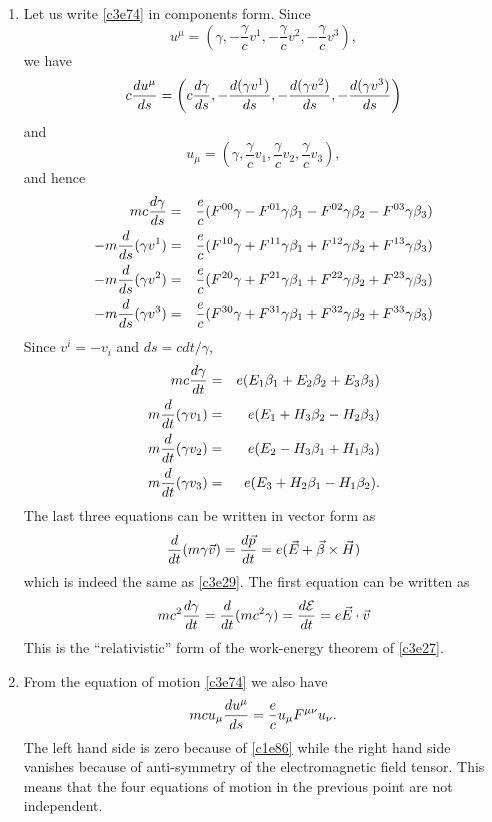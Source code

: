 \begin{enumerate}
\item Let us write \eqref{c3e74} in components form. Since
\[
u^\mu = \left(\gamma, -\frac{\gamma}{c}v^1, -\frac{\gamma}{c}v^2, -\frac{\gamma}{c}v^3\right),
\]
we have
\[
c\frac{d{u^\mu}}{d{s}} = \left(c\frac{d{\gamma}}{d{s}}, -\frac{d{(\gamma v^1)}}{d{s}}, 
-\frac{d{(\gamma v^2)}}{d{s}}, -\frac{d{(\gamma v^3)}}{d{s}}\right)
\]
and
\[
u_\mu = \left(\gamma, \frac{\gamma}{c}v_1, \frac{\gamma}{c}v_2, \frac{\gamma}{c}v_3\right),
\]
and hence
\begin{eqnarray*}
mc\frac{d{\gamma}}{d{s}} &=& \frac{e}{c}(F^{00}\gamma - F^{01}\gamma \beta_1 - F^{02}\gamma \beta_2 -F^{03}\gamma \beta_3) \\
-m\frac{d}{ds}(\gamma v^1)&=&\frac{e}{c}(F^{10}\gamma + F^{11}\gamma \beta_1 + F^{12}\gamma \beta_2 + F^{13}\gamma \beta_3) \\
-m\frac{d}{ds}(\gamma v^2)&=&\frac{e}{c}(F^{20}\gamma + F^{21}\gamma \beta_1 + F^{22}\gamma \beta_2 + F^{23}\gamma \beta_3) \\
-m\frac{d}{ds}(\gamma v^3)&=&\frac{e}{c}(F^{30}\gamma + F^{31}\gamma \beta_1 + F^{32}\gamma \beta_2 + F^{33}\gamma \beta_3) 
\end{eqnarray*}
Since $v^i = -v_i$ and $ds = cdt/\gamma$,
\begin{eqnarray*}
mc\frac{d{\gamma}}{d{t}} &=& e(E_1 \beta_1 + E_2 \beta_2 + E_3 \beta_3) \\
m\frac{d}{dt}(\gamma v_1) &=& e(E_1 + H_3 \beta_2 - H_2 \beta_3) \\
m\frac{d}{dt}(\gamma v_2) &=& e(E_2 - H_3 \beta_1 + H_1 \beta_3) \\
m\frac{d}{dt}(\gamma v_3) &=& e(E_3 + H_2 \beta_1 - H_1 \beta_2).
\end{eqnarray*}
The last three equations can be written in vector form as
\[
\frac{d}{dt}(m\gamma\vec{v}) = \frac{d{\vec{p}}}{d{t}} = e(\vec{E} + \vec{\beta} \times \vec{H})
\]
which is indeed the same as \eqref{c3e29}. The first equation can be written as
\[
mc^2\frac{d{\gamma}}{d{t}} = \frac{d}{dt}(mc^2\gamma) = \frac{d{\mathcal{E}}}{d{t}} = e\vec{E}\cdot\vec{v}
\]
This is the ``relativistic'' form of the work-energy theorem of \eqref{c3e27}.

\item From the equation of motion \eqref{c3e74} we also have
\[
mcu_\mu\frac{d{u^\mu}}{d{s}} = \frac{e}{c}u_\mu F^{\mu\nu}u_\nu.
\]
The left hand side is zero because of \eqref{c1e86} while the right hand side 
vanishes because of anti-symmetry of the electromagnetic field tensor. This means
that the four equations of motion in the previous point are not independent.


\end{enumerate}
